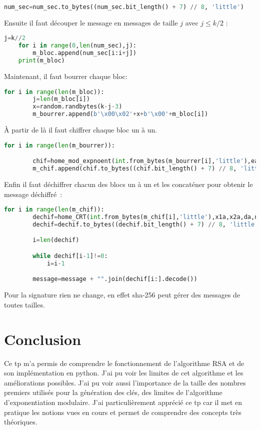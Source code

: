 \documentclass[12pt]{article}
\begin{document}
\begin{lstlisting}[language=python]
    num_sec=num_sec.to_bytes((num_sec.bit_length() + 7) // 8, 'little')
\end{lstlisting}

Ensuite il faut découper le message en messages de taille $j$ avec $j \le k/2$ :
\begin{lstlisting}[language=python]
    j=k//2
    for i in range(0,len(num_sec),j):
        m_bloc.append(num_sec[i:i+j])
    print(m_bloc)
\end{lstlisting}

Maintenant, il faut bourrer chaque bloc:

\begin{lstlisting}[language=python]
    for i in range(len(m_bloc)):
        j=len(m_bloc[i])
        x=random.randbytes(k-j-3)
        m_bourrer.append(b'\x00\x02'+x+b'\x00'+m_bloc[i])
\end{lstlisting}

À partir de là il faut chiffrer chaque bloc un à un.

\begin{lstlisting}[language=python]
    for i in range(len(m_bourrer)):

        chif=home_mod_expnoent(int.from_bytes(m_bourrer[i],'little'),ea,na)
        m_chif.append(chif.to_bytes((chif.bit_length() + 7) // 8, 'little'))
\end{lstlisting}

Enfin il faut déchiffrer chacun des blocs un à un et les concaténer pour obtenir le message déchiffré :

\begin{lstlisting}[language=python]
    for i in range(len(m_chif)):
        dechif=home_CRT(int.from_bytes(m_chif[i],'little'),x1a,x2a,da,na)
        dechif=dechif.to_bytes((dechif.bit_length() + 7) // 8, 'little')

        i=len(dechif)

        while dechif[i-1]!=0:
            i=i-1

        message=message + "".join(dechif[i:].decode())    
\end{lstlisting}

Pour la signature rien ne change, en effet sha-256 peut gérer des messages de toutes tailles.

\section{Conclusion}

Ce tp m'a permis de comprendre le fonctionnement de l'algorithme RSA et de son implémentation en python. J'ai pu voir les limites de cet algorithme et les améliorations possibles.
J'ai pu voir aussi l'importance de la taille des nombres premiers utilisés pour la génération des clés, des limites de l'algorithme d'exponentiation modulaire.
J'ai particulièrement apprécié ce tp car il met en pratique les notions vues en cours et permet de comprendre des concepts très théoriques.
\end{document}
